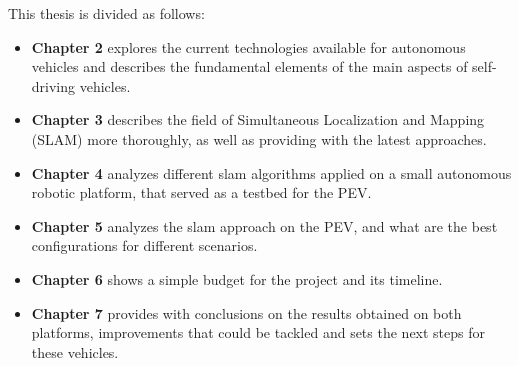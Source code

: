 This thesis is divided as follows:

\begin{itemize}
  \item \textbf{Chapter 2} explores the current technologies available for autonomous vehicles and describes the fundamental elements of the main aspects of self-driving vehicles.

  \item \textbf{Chapter 3} describes the field of Simultaneous Localization and Mapping (SLAM) more thoroughly, as well as providing with the latest approaches.
  
  \item \textbf{Chapter 4} analyzes different slam algorithms applied on a small autonomous robotic platform, that served as a testbed for the PEV.

  \item \textbf{Chapter 5} analyzes the slam approach on the PEV, and what are the best configurations for different scenarios.

  \item \textbf{Chapter 6} shows a simple budget for the project and its timeline.

  \item \textbf{Chapter 7} provides with conclusions on the results obtained on both platforms, improvements that could be tackled and sets the next steps for these vehicles.

\end{itemize} 

